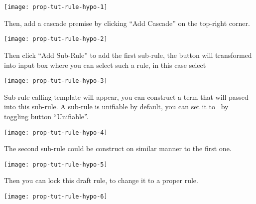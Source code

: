 \documentclass[master.tex]{subfiles}
\begin{document}
\begin{center}
  \texttt{[image: prop-tut-rule-hypo-1]}
\end{center}

Then, add a cascade premise by clicking ``Add Cascade'' on the top-right corner.

\begin{center}
  \texttt{[image: prop-tut-rule-hypo-2]}
\end{center}

Then click ``Add Sub-Rule'' to add the first sub-rule, the button will
transformed into input box where you can select such a rule, in this case select

\begin{center}
  \texttt{[image: prop-tut-rule-hypo-3]}
\end{center}

Sub-rule calling-template will appear, you can construct a term that will passed
into this sub-rule. A sub-rule is unifiable by default, you can set it to
\kExactMatch\ by toggling button ``Unifiable''.

\begin{center}
  \texttt{[image: prop-tut-rule-hypo-4]}
\end{center}

The second sub-rule could be construct on similar manner to the first one.

\begin{center}
  \texttt{[image: prop-tut-rule-hypo-5]}
\end{center}

Then you can lock this draft rule, to change it to a proper rule.

\begin{center}
  \texttt{[image: prop-tut-rule-hypo-6]}
\end{center}
\end{document}
